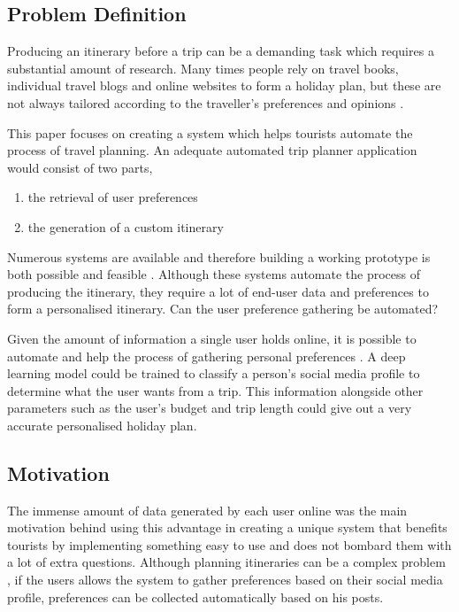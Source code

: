 \subsection{Problem Definition}

        Producing an itinerary before a trip can be a demanding task
        which requires  a substantial amount of  research. Many times
        people rely on travel books, individual travel blogs and
        online websites to form a holiday plan, but these are not
        always tailored according to the traveller’s preferences and
        opinions \cite{DeChoudhury2010}. 

        This paper focuses on creating a system which helps tourists
        automate the process of travel planning. An adequate automated
        trip planner application would consist of two parts, 
        
        \begin{enumerate}
                \item the retrieval of user preferences 
                \item the generation of a custom itinerary
        \end{enumerate}
        Numerous systems are available and therefore building a
        working prototype is both possible and feasible
        \cite{Sylejmani2017,Chang2016,Sylejmani2012,Sebastia2009a,
        Tumas2009, Vansteenwegen2011,Kurata2013, RamalhoBrilhante2014,
        DeChoudhury2010,DUNSTALL2008a, DiBitonto2010a,Gavalas }.
        Although these systems automate the process of producing the
        itinerary, they require a lot of end-user data and preferences
        to form a personalised itinerary. Can the user preference
        gathering be automated?

        Given the amount of information a single user holds online, it
        is possible to automate and help the process of gathering
        personal preferences \cite{Buraya2017}. A deep learning model
        could be trained to classify a person's social media profile
        to determine what the user wants from a trip. This information
        alongside other parameters such as the user's budget and trip
        length could give out a very accurate personalised holiday
        plan.

\subsection{Motivation}

        The immense amount of data generated by each user online
        \cite{J.Clement2020} was the main motivation behind using this
        advantage in creating a unique system that benefits tourists
        by implementing something easy to use and does not bombard
        them with a lot of extra questions. Although planning
        itineraries can be a complex problem \cite{DUNSTALL2008a}, if
        the users allows the system to gather preferences based on
        their social media profile, preferences can be collected
        automatically based on his posts. 


